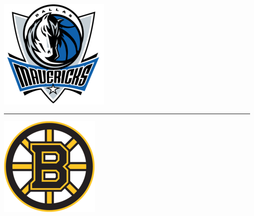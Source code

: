 \documentclass[landscape]{article}
\begin{document}
\begin{multicols}{3}
\begin{center}
	
\end{center}
\begin{minipage}{0.1\linewidth}
	\includegraphics[width=\linewidth]{images/mavs-logo.png}
\end{minipage}
\begin{minipage}{0.9\linewidth}
	
\end{minipage}
\hrule
\begin{center}
	
\end{center}
\begin{minipage}{0.1\linewidth}
	\includegraphics[width=\linewidth]{images/bruins-logo.png}

\end{minipage}
\end{multicols}
\end{document}
